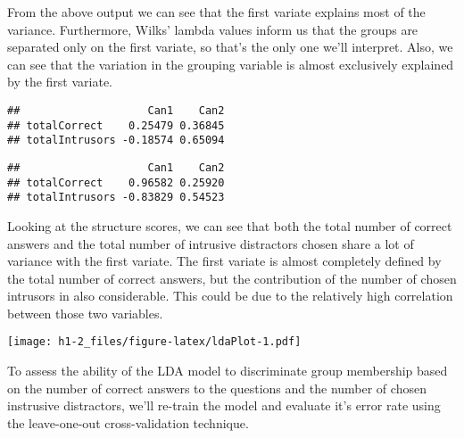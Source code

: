 \documentclass[12pt,]{article}
\begin{document}
From the above output we can see that the first variate explains most of
the variance. Furthermore, Wilks' lambda values inform us that the
groups are separated only on the first variate, so that's the only one
we'll interpret. Also, we can see that the variation in the grouping
variable is almost exclusively explained by the first variate.

\begin{verbatim}
##                    Can1    Can2
## totalCorrect    0.25479 0.36845
## totalIntrusors -0.18574 0.65094
\end{verbatim}

\begin{verbatim}
##                    Can1    Can2
## totalCorrect    0.96582 0.25920
## totalIntrusors -0.83829 0.54523
\end{verbatim}

Looking at the structure scores, we can see that both the total number
of correct answers and the total number of intrusive distractors chosen
share a lot of variance with the first variate. The first variate is
almost completely defined by the total number of correct answers, but
the contribution of the number of chosen intrusors in also considerable.
This could be due to the relatively high correlation between those two
variables.

\texttt{[image: h1-2\_files/figure-latex/ldaPlot-1.pdf]}

To assess the ability of the LDA model to discriminate group membership
based on the number of correct answers to the questions and the number
of chosen instrusive distractors, we'll re-train the model and evaluate
it's error rate using the leave-one-out cross-validation technique.
\end{document}
